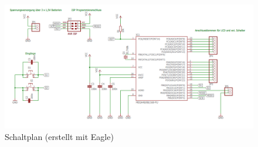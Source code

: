 
\begin{figure}[t]
  \centering
  \includegraphics[width=1\linewidth, keepaspectratio]{Bilder/DIYShematic}
  \caption{Schaltplan (erstellt mit Eagle)}
  \label{shematic}
\end{figure}

